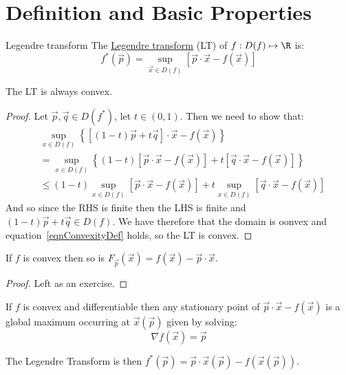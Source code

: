 \documentclass[../Main.tex]{subfiles}
\begin{document}
\section{Definition and Basic Properties}
\begin{definition}{Legendre transform}
    The \underline{Legendre transform} (LT) of $f : D(f) \mapsto \R$ is:
    \begin{equation}
        f^*(\vec{p}) = \sup_{\vec{x} \in D(f)} \left[\vec{p} \cdot \vec{x} - f(\vec{x})\right]
        \label{eqnLT}
    \end{equation}
\end{definition}
\begin{proposition}
    The LT is always convex.
    \label{propLTConvex}
\end{proposition}
\begin{proof}
    Let $\vec{p}, \vec{q} \in D(f^*)$, let $t \in (0, 1)$. Then we need to show that:
    \begin{align*}
        &\sup_{x \in D(f)} \left\{\left[(1 - t)\vec{p} + t\vec{q}\right] \cdot \vec{x} - f(\vec{x})\right\} \\
        &= \sup_{x \in D(f)} \left\{(1-t)\left[\vec{p} \cdot \vec{x} - f(\vec{x})\right] + t \left[\vec{q} \cdot \vec{x} - f(\vec{x})\right]\right\} \\
        &\leq (1-t) \sup_{x \in D(f)} \left[\vec{p} \cdot \vec{x} - f(\vec{x})\right] + t \sup_{x \in D(f)} \left[\vec{q} \cdot \vec{x} - f(\vec{x})\right]
    \end{align*}
    And so since the RHS is finite then the LHS is finite and $(1-t)\vec{p} + t\vec{q} \in D(f)$. We have therefore that the domain is oonvex and equation~\ref{eqnConvexityDef} holds, so the LT is convex.
\end{proof}
\begin{proposition}
    If $f$ is convex then so is $F_{\vec{p}}(\vec{x}) = f(\vec{x}) - \vec{p} \cdot \vec{x}$.
\end{proposition}
\begin{proof}
    Left as an exercise.
\end{proof}
\begin{corollary}
    If $f$ is convex and differentiable then any stationary point of $\vec{p} \cdot \vec{x} - f(\vec{x})$ is a global maximum occurring at $\vec{x}(\vec{p})$ given by solving:
    \begin{equation}
        \nabla f(\vec{x}) = \vec{p}
        \label{eqnLegendreMax}
    \end{equation}

    The Legendre Transform is then $f^*(\vec{p}) = \vec{p} \cdot \vec{x}(\vec{p}) - f(\vec{x}(\vec{p}))$.
\end{corollary}
\end{document}
